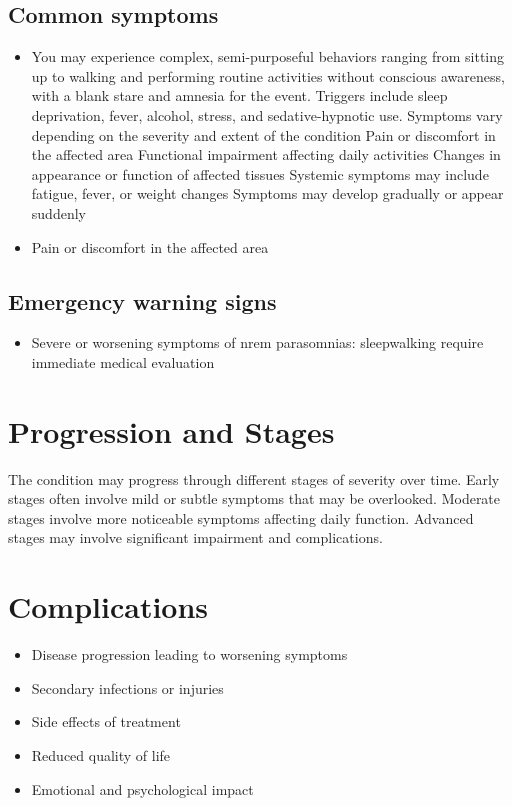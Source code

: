 \subsection{Common symptoms}
\begin{itemize}[noitemsep]
  \item You may experience complex, semi-purposeful behaviors ranging from sitting up to walking and performing routine activities without conscious awareness, with a blank stare and amnesia for the event. Triggers include sleep deprivation, fever, alcohol, stress, and sedative-hypnotic use. Symptoms vary depending on the severity and extent of the condition Pain or discomfort in the affected area Functional impairment affecting daily activities Changes in appearance or function of affected tissues Systemic symptoms may include fatigue, fever, or weight changes Symptoms may develop gradually or appear suddenly
  \item Pain or discomfort in the affected area
  \end{itemize}

\subsection{Emergency warning signs}
\begin{itemize}[noitemsep]
  \item Severe or worsening symptoms of nrem parasomnias: sleepwalking require immediate medical evaluation
\end{itemize}
\section{Progression and Stages}
The condition may progress through different stages of severity over time. Early stages often involve mild or subtle symptoms that may be overlooked. Moderate stages involve more noticeable symptoms affecting daily function. Advanced stages may involve significant impairment and complications.
\section{Complications}
\begin{itemize}[noitemsep]
  \item Disease progression leading to worsening symptoms
  \item Secondary infections or injuries
  \item Side effects of treatment
  \item Reduced quality of life
  \item Emotional and psychological impact
\end{itemize}
